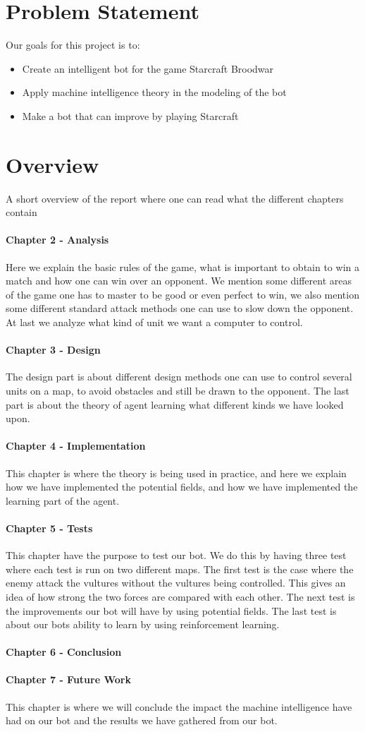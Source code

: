 \section{Problem Statement}
	Our goals for this project is to:
	\begin{itemize}
		\item Create an intelligent bot for the game Starcraft Broodwar
		\item Apply machine intelligence theory in the modeling of the bot
		\item Make a bot that can improve by playing Starcraft
	\end{itemize}

\section{Overview}
	A short overview of the report where one can read what the different chapters contain

\paragraph*{Chapter 2 - Analysis}
Here we explain the basic rules of the game, what is important to obtain to win a match and how one can win over an opponent. We mention some different areas of the game one has to master to be good or even perfect to win, we also mention some different standard attack methods one can use to slow down the opponent. At last we analyze what kind of unit we want a computer to control.
\paragraph*{Chapter 3 - Design}
The design part is about different design methods one can use to control several units on a map, to avoid obstacles and still be drawn to the opponent. The last part is about the theory of agent learning what different kinds we have looked upon.
\paragraph*{Chapter 4 - Implementation}
This chapter is where the theory is being used in practice, and here we explain how we have implemented the potential fields, and how we have implemented the learning part of the agent.
\paragraph*{Chapter 5 - Tests}
This chapter have the purpose to test our bot. We do this by having three test where each test is run on two different maps. The first test is the case
where the enemy attack the vultures without the vultures being controlled. This gives an idea of how strong the two forces are compared with each other. The next test is the improvements our bot will have by using potential fields. The last test is about our bots ability to learn by using reinforcement learning.
\paragraph*{Chapter 6 - Conclusion}
\paragraph*{Chapter 7 - Future Work}
This chapter is where we will conclude the impact the machine intelligence have had on our bot and the results we have gathered from our bot.

